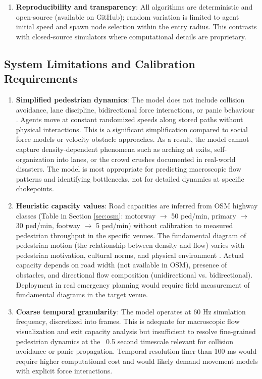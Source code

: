 \documentclass[conference]{IEEEtran}
\begin{document}
\begin{enumerate}
\item \textbf{Reproducibility and transparency}: All algorithms are deterministic and open-source (available on GitHub); random variation is limited to agent initial speed and spawn node selection within the entry radius. This contrasts with closed-source simulators where computational details are proprietary.
\end{enumerate}

\subsection{System Limitations and Calibration Requirements}

\begin{enumerate}
\item \textbf{Simplified pedestrian dynamics}: The model does not include collision avoidance, lane discipline, bidirectional force interactions, or panic behaviour \cite{helbing2000simulating}. Agents move at constant randomized speeds along stored paths without physical interactions. This is a significant simplification compared to social force models \cite{helbing2000simulating} or velocity obstacle approaches. As a result, the model cannot capture density-dependent phenomena such as arching at exits, self-organization into lanes, or the crowd crushes documented in real-world disasters. The model is most appropriate for predicting macroscopic flow patterns and identifying bottlenecks, not for detailed dynamics at specific chokepoints.

\item \textbf{Heuristic capacity values}: Road capacities are inferred from OSM highway classes (Table in Section \ref{sec:osm}: motorway $\to$ 50 ped/min, primary $\to$ 30 ped/min, footway $\to$ 5 ped/min) without calibration to measured pedestrian throughput in the specific venues. The fundamental diagram of pedestrian motion (the relationship between density and flow) varies with pedestrian motivation, cultural norms, and physical environment \cite{seyfried2005fundamental}. Actual capacity depends on road width (not available in OSM), presence of obstacles, and directional flow composition (unidirectional vs. bidirectional). Deployment in real emergency planning would require field measurement of fundamental diagrams in the target venue.

\item \textbf{Coarse temporal granularity}: The model operates at 60 Hz simulation frequency, discretized into frames. This is adequate for macroscopic flow visualization and exit capacity analysis but insufficient to resolve fine-grained pedestrian dynamics at the ~0.5 second timescale relevant for collision avoidance or panic propagation. Temporal resolution finer than 100 ms would require higher computational cost and would likely demand movement models with explicit force interactions.


\end{enumerate}
\end{document}
